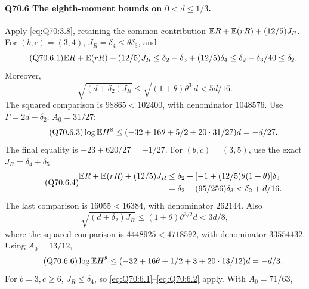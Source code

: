 \paragraph{Q70.6 The eighth-moment bounds on \(0<\allowbreak d\le\allowbreak 1/3\).}
Apply \eqref{eq:Q70:3.8}, retaining the common contribution
\(\mathbb E R+\mathbb E(rR)+(12/5)J_R\).
For \((b,\allowbreak c)=\allowbreak (3,\allowbreak 4)\), \(J_R=\allowbreak \delta_4\le\allowbreak \theta\delta_3\), and
\begin{equation}\tag{Q70.6.1}\label{eq:Q70:6.1}
\mathbb E R+\mathbb E(rR)+(12/5)J_R
\le\delta_2-\delta_3+(12/5)\delta_4
\le\delta_2-\delta_3/40\le\delta_2.
\end{equation}
Moreover,
\begin{equation}\tag{Q70.6.2}\label{eq:Q70:6.2}
\sqrt{(d+\delta_2)J_R}
\le\sqrt{(1+\theta)\theta^3}\,d<5d/16.
\end{equation}
The squared comparison is \(98865<\allowbreak 102400\), with denominator
\(1048576\). Use \(\Gamma=\allowbreak 2d-\delta_2\), \(A_0=\allowbreak 31/27\):
\begin{equation}\tag{Q70.6.3}\label{eq:Q70:6.3}
\log\mathbb E H^8\le(-32+16\theta+5/2+20\cdot31/27)d=-d/27.
\end{equation}
The final equality is \(-23+620/27=\allowbreak -1/27\).
For \((b,\allowbreak c)=\allowbreak (3,\allowbreak 5)\), use the exact \(J_R=\allowbreak \delta_4+\delta_5\):
\begin{equation}\tag{Q70.6.4}\label{eq:Q70:6.4}
\begin{aligned}
\mathbb E R+\mathbb E(rR)+(12/5)J_R
&\le\delta_2+[-1+(12/5)\theta(1+\theta)]\delta_3\\
&=\delta_2+(95/256)\delta_3<\delta_2+d/16.
\end{aligned}
\end{equation}
The last comparison is \(16055<\allowbreak 16384\), with denominator \(262144\).
Also
\begin{equation}\tag{Q70.6.5}\label{eq:Q70:6.5}
\sqrt{(d+\delta_2)J_R}\le(1+\theta)\theta^{3/2}d<3d/8,
\end{equation}
where the squared comparison is \(4448925<\allowbreak 4718592\), with
denominator \(33554432\). Using \(A_0=\allowbreak 13/12\),
\begin{equation}\tag{Q70.6.6}\label{eq:Q70:6.6}
\log\mathbb E H^8\le(-32+16\theta+1/2+3+20\cdot13/12)d=-d/3.
\end{equation}
For \(b=\allowbreak 3,\allowbreak c\ge\allowbreak 6\), \(J_R\le\allowbreak \delta_4\), so
\eqref{eq:Q70:6.1}--\eqref{eq:Q70:6.2} apply. With \(A_0=\allowbreak 71/63\),
